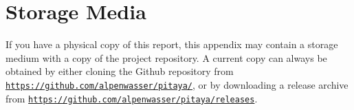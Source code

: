 %
%
\chapter{Storage Media} %
\label{ch:app:media}

If  you have  a physical  copy of  this report,  this appendix  may contain  a
storage medium  with a  copy of  the project  repository. A current  copy can
always be obtained by either cloning the Github repository from
\href{https://github.com/alpenwasser/pitaya/}{\nolinkurl{https://github.com/alpenwasser/pitaya/}},
or by downloading a release archive from 
\href{https://github.com/alpenwasser/pitaya/releases}{\nolinkurl{https://github.com/alpenwasser/pitaya/releases}}.
